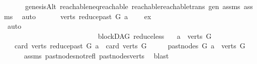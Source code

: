 \begin{isabellebody}
\ \ \ \ \ \ genesisAlt\ reachable{\isacharunderscore}{\kern0pt}neq{\isacharunderscore}{\kern0pt}reachable{}\ reachable{\isacharunderscore}{\kern0pt}reachable{}{\isacharunderscore}{\kern0pt}trans\ gen\ assms{\isacharparenleft}{\kern0pt}{}{\isacharparenright}{\kern0pt}\ assms{\isacharparenleft}{\kern0pt}{}{\isacharparenright}{\kern0pt}\ \isamarkupfalse%
\ auto\ \isanewline
\ \ \isamarkupfalse%
\ \isamarkupfalse%
\ {\isachardoublequoteopen}{\isacharparenleft}{\kern0pt}verts\ {\isacharparenleft}{\kern0pt}reduce{\isacharunderscore}{\kern0pt}past\ G\ a{\isacharparenright}{\kern0pt}{\isacharparenright}{\kern0pt}\ {\isasymnoteq}\ {\isacharbraceleft}{\kern0pt}{\isacharbraceright}{\kern0pt}{\isachardoublequoteclose}\ \isamarkupfalse%
\ ex\ \isamarkupfalse%
\ auto\ \ \ \ \ \ \ \ \ \ \ \ \ \ \ \ \ \ \ \ \ \ \ \ \ \ \ \ \ \ \ \ \ \ \ \ \ \ \ \ \ \ \ \ \ \ \ \ \ \ \ \ \ \ \ \ \ \ \ \ \ \ \ \ \ \ \ \ \ \ \ \ \ \ \ \ \ \ \ \ \ \ \ \ \ \ \ \ \ \ \ \isanewline
{}\isamarkupfalse%
%
\endisatagproof
{\isafoldproof}%
%
\isadelimproof
\isanewline
%
\endisadelimproof
\isanewline
{}\isamarkupfalse%
\ {\isacharparenleft}{\kern0pt}\ blockDAG{\isacharparenright}{\kern0pt}\ reduce{\isacharunderscore}{\kern0pt}less{\isacharcolon}{\kern0pt}\isanewline
\ \ \ {\isachardoublequoteopen}a\ {\isasymin}\ verts\ G{\isachardoublequoteclose}\isanewline
\ \ \ {\isachardoublequoteopen}card\ {\isacharparenleft}{\kern0pt}verts\ {\isacharparenleft}{\kern0pt}reduce{\isacharunderscore}{\kern0pt}past\ G\ a{\isacharparenright}{\kern0pt}{\isacharparenright}{\kern0pt}\ {\isacharless}{\kern0pt}\ card\ {\isacharparenleft}{\kern0pt}verts\ G{\isacharparenright}{\kern0pt}{\isachardoublequoteclose}\isanewline
%
\isadelimproof
%
\endisadelimproof
%
\isatagproof
{}\isamarkupfalse%
\ {\isacharminus}{\kern0pt}\isanewline
\ \ \isamarkupfalse%
\ {\isachardoublequoteopen}past{\isacharunderscore}{\kern0pt}nodes\ G\ a\ {\isasymsubset}\ verts\ G{\isachardoublequoteclose}\isanewline
\ \ \ \ \isamarkupfalse%
\ assms{\isacharparenleft}{\kern0pt}{}{\isacharparenright}{\kern0pt}\ past{\isacharunderscore}{\kern0pt}nodes{\isacharunderscore}{\kern0pt}not{\isacharunderscore}{\kern0pt}refl\ past{\isacharunderscore}{\kern0pt}nodes{\isacharunderscore}{\kern0pt}verts\ \isamarkupfalse%
\ blast\isanewline
\ \ \isamarkupfalse%
\ \isamarkupfalse%

\end{isabellebody}
